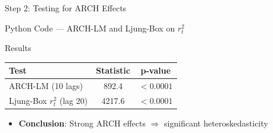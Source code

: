 \documentclass[9pt, aspectratio=169, t]{beamer}
\begin{document}
\begin{frame}{Step 2: Testing for ARCH Effects}
    \small
    \begin{block}{Python Code --- ARCH-LM and Ljung-Box on $r_t^2$}
    \end{block}
    \begin{exampleblock}{Results}
        {\small
        \begin{tabular}{lcc}
            \toprule
            \textbf{Test} & \textbf{Statistic} & \textbf{p-value} \\
            \midrule
            ARCH-LM (10 lags) & 892.4 & $< 0.0001$ \\
            Ljung-Box $r_t^2$ (lag 20) & 4217.6 & $< 0.0001$ \\
            \bottomrule
        \end{tabular}
        }
        \begin{itemize}\setlength{\itemsep}{0pt}
            \item \textbf{Conclusion}: Strong ARCH effects $\Rightarrow$ significant heteroskedasticity
        \end{itemize}
    \end{exampleblock}
\end{frame}
\end{document}
